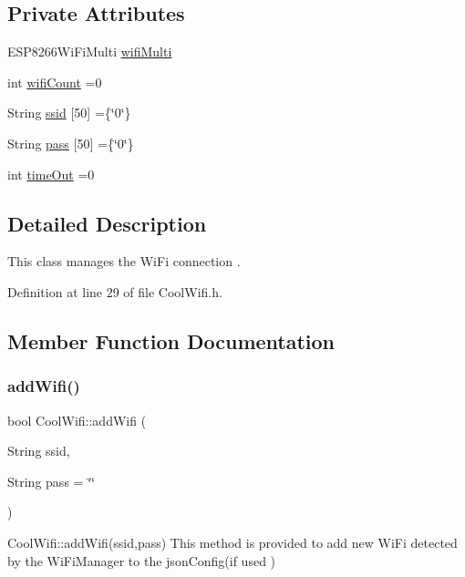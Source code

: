 \subsection*{Private Attributes}
\begin{DoxyCompactItemize}
\item 
E\+S\+P8266\+Wi\+Fi\+Multi \hyperlink{classCoolWifi_a7862a8c0d7239877e2956c14a368aab8}{wifi\+Multi}
\item 
int \hyperlink{classCoolWifi_ab133bd92fcb895b884deecd6678592e4}{wifi\+Count} =0
\item 
String \hyperlink{classCoolWifi_a893b21d0fed821438733bba2e73fb4c2}{ssid} \mbox{[}50\mbox{]} =\{\char`\"{}0\char`\"{}\}
\item 
String \hyperlink{classCoolWifi_a0c3332a149245aaad060b32593a54c9b}{pass} \mbox{[}50\mbox{]} =\{\char`\"{}0\char`\"{}\}
\item 
int \hyperlink{classCoolWifi_a952111605f25156588b5632caaba1c6f}{time\+Out} =0
\end{DoxyCompactItemize}


\subsection{Detailed Description}
This class manages the Wi\+Fi connection . 

Definition at line 29 of file Cool\+Wifi.\+h.



\subsection{Member Function Documentation}
\mbox{\label{classCoolWifi_a914d7a1df14dd6b75345fb614c34e9d6}} 
\subsubsection{\texorpdfstring{add\+Wifi()}{addWifi()}}
{\footnotesize\ttfamily bool Cool\+Wifi\+::add\+Wifi (\begin{DoxyParamCaption}\item[{String}]{ssid,  }\item[{String}]{pass = {\ttfamily \char`\"{}\char`\"{}} }\end{DoxyParamCaption})}

Cool\+Wifi\+::add\+Wifi(ssid,pass) This method is provided to add new Wi\+Fi detected by the Wi\+Fi\+Manager to the json\+Config(if used )

